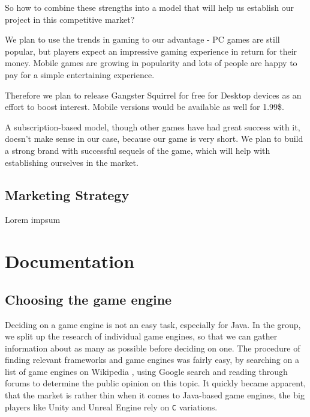 \documentclass[12p]{article}
\begin{document}
So how to combine these strengths into a model that will help us establish our project in this competitive market?

We plan to use the trends in gaming to our advantage - PC games are still popular, but players expect an impressive gaming experience in return for their money. Mobile games are growing in popularity and lots of people are happy to pay for a simple entertaining experience.

Therefore we plan to release Gangster Squirrel for free for Desktop devices as an effort to boost interest. Mobile versions would be available as well for 1.99\$.

A subscription-based model, though other games have had great success with it, doesn’t make sense in our case, because our game is very short. We plan to build a strong brand with successful sequels of the game, which will help with establishing ourselves in the market.

\subsection{Marketing Strategy}
Lorem impsum


\newpage
\section{Documentation}


\subsection{Choosing the game engine}

Deciding on a game engine is not an easy task, especially for Java. In the group, we split up the research of individual game engines, so that we can gather information about as many as possible before deciding on one. The procedure of finding relevant frameworks and game engines was fairly easy, by searching on a list of game engines on Wikipedia \cite{ListOfGameEngines}, using Google search and reading through forums to determine the public opinion on this topic. It quickly became apparent, that the market is rather thin when it comes to Java-based game engines, the big players like Unity and Unreal Engine rely on \texttt{C} variations.
\end{document}
